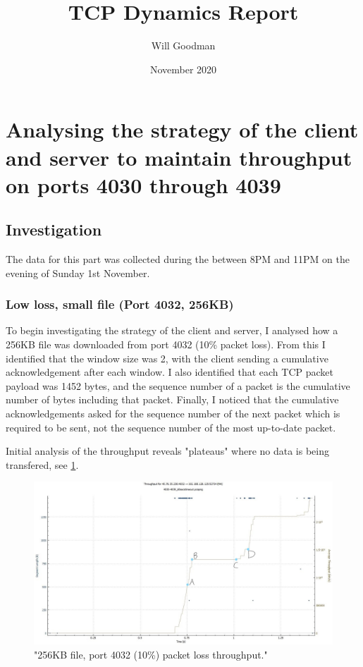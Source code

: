 \documentclass[12pt]{article}
\title{TCP Dynamics Report}
\date{November 2020}
\author{Will Goodman}
\begin{document}
\maketitle

\section{Analysing the strategy of the client and server to maintain throughput on ports 4030 through 4039}
\subsection*{Investigation}
The data for this part was collected during the between 8PM and 11PM on the evening of Sunday 1st November.

\subsubsection*{Low loss, small file (Port 4032, 256KB)}
To begin investigating the strategy of the client and server, I analysed how a 256KB file was downloaded from port 4032 (10\% packet loss).
From this I identified that the window size was 2, with the client sending a cumulative acknowledgement after each window.
I also identified that each TCP packet payload was 1452 bytes, and the sequence number of a packet is the cumulative number of bytes including that packet.
Finally, I noticed that the cumulative acknowledgements asked for the sequence number of the next packet which is required to be sent, not the sequence number of the most up-to-date packet.

Initial analysis of the throughput reveals "plateaus" where no data is being transfered, see \ref{figure1: 4032:256KB Throughput}.

\begin{figure}[!htbp]
  \centering
  \includegraphics[scale=0.3]{4032_256KB_throughput-marked-points.jpg}
  \caption{"256KB file, port 4032 (10\%) packet loss throughput."}
  \label{figure1: 4032:256KB Throughput}
\end{figure}
\end{document}
